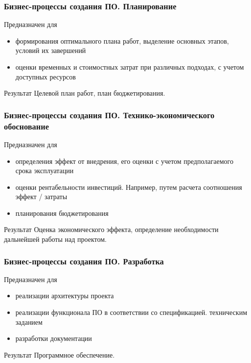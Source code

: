 \documentclass{../industrial-development}
\begin{document}
\begin{frame} \frametitle{Бизнес-процессы создания ПО. Планирование}
	\begin{block}{Предназначен для}
		\begin{itemize}
			\item формирования оптимального плана работ, выделение основных этапов, условий их завершений
			\item оценки временных и стоимостных затрат при различных подходах, с учетом доступных ресурсов
		\end{itemize}
	\end{block}
	\begin{block}{Результат}
		Целевой план работ, план бюджетирования.
	\end{block}
\end{frame}
\lecturenotes


\begin{frame} \frametitle{Бизнес-процессы создания ПО. Технико-экономического обоснование}
	\begin{block}{Предназначен для}
		\begin{itemize}
			\item определения эффект от внедрения, его оценки с учетом предполагаемого срока эксплуатации
			\item оценки рентабельности инвестиций. Например, путем расчета соотношения эффект / затраты
			\item планирования бюджетирования
		\end{itemize}
	\end{block}
	\begin{block}{Результат}
		Оценка экономического эффекта, определение необходимости дальнейшей работы над проектом.
	\end{block}
\end{frame}
\lecturenotes


\begin{frame} \frametitle{Бизнес-процессы создания ПО. Разработка}
	\begin{block}{Предназначен для}
		\begin{itemize}
			\item реализации архитектуры проекта
			\item реализации функционала ПО в соответствии со спецификацией. техническим заданием
			\item разработки документации
		\end{itemize}
	\end{block}
	\begin{block}{Результат}
		Программное обеспечение.
	\end{block}
\end{frame}
\lecturenotes
\end{document}
